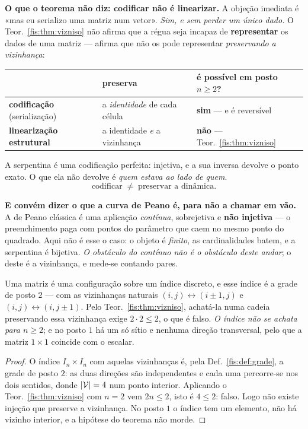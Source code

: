 \documentclass[livro.tex]{subfiles}
\begin{document}
\medskip\noindent\textbf{O que o teorema não diz: codificar não é linearizar.} A
objeção imediata é «mas eu serializo uma matriz num vetor». \emph{Sim, e sem
perder um único dado.} O Teor.~\ref{fis:thm:vizniso} não afirma que a régua seja
incapaz de \textbf{representar} os dados de uma matriz --- afirma que não os pode
representar \emph{preservando a vizinhança}:
\begin{center}\small
\begin{tabular}{@{}lll@{}}
\toprule
 & preserva & é possível em posto $n\ge2$?\\
\midrule
\textbf{codificação} (serialização) & a \emph{identidade} de cada célula & \textbf{sim} --- e é reversível\\
\textbf{linearização estrutural} & a identidade \emph{e} a vizinhança & \textbf{não} --- Teor.~\ref{fis:thm:vizniso}\\
\bottomrule
\end{tabular}
\end{center}
A serpentina é uma codificação perfeita: injetiva, e a sua inversa devolve o
ponto exato. O que ela não devolve é \emph{quem estava ao lado de quem}.
\[
\boxed{\ \text{codificar}\;\neq\;\text{preservar a dinâmica}.\ }
\]

\medskip\noindent\textbf{E convém dizer o que a curva de Peano é, para não a
chamar em vão.} A de Peano clássica é uma aplicação \emph{contínua}, sobrejetiva
e \textbf{não injetiva} --- o preenchimento paga com pontos do parâmetro que caem
no mesmo ponto do quadrado. Aqui não é esse o caso: o objeto é \emph{finito}, as
cardinalidades batem, e a serpentina é bijetiva. \emph{O obstáculo do contínuo
não é o obstáculo deste andar}; o deste é a vizinhança, e mede-se contando pares.

\begin{corolario}\label{fis:cor:matriz}
Uma matriz é uma configuração sobre um índice discreto, e esse índice é a grade
de posto $2$ --- com as vizinhanças naturais $(i,j)\leftrightarrow(i\pm1,j)$ e
$(i,j)\leftrightarrow(i,j\pm1)$. Pelo Teor.~\ref{fis:thm:vizniso}, achatá-la numa
cadeia preservando essa vizinhança exige $2\cdot2\le2$, o que é falso. \emph{O
índice não se achata para $n\ge2$}; e no posto $1$ há um só sítio e nenhuma
direção transversal, pelo que a matriz $1\times1$ coincide com o escalar.
\end{corolario}

\begin{proof}
O índice $I_n\times I_n$ com aquelas vizinhanças é, pela
Def.~\ref{fis:def:grade}, a grade de posto $2$: as duas direções são
independentes e cada uma percorre-se nos dois sentidos, donde
$\lvert \mathcal{V}\rvert=4$ num ponto interior. Aplicando o
Teor.~\ref{fis:thm:vizniso} com $n=2$ vem $2n\le2$, isto é $4\le2$: falso. Logo
não existe injeção que preserve a vizinhança. No posto $1$ o índice tem um
elemento, não há vizinho interior, e a hipótese do teorema não morde.
\end{proof}
\end{document}

